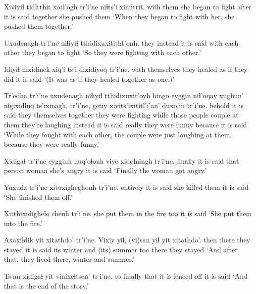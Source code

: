 \documentclass[12pt]{article}
\begin{document}
\gll Xiviyiɬ tidltthit  xotl'ogh tr'i'ne niɬts'i  xiniɬtrit.
{with them} {she began to fight} after  {it is said} together {she pushed them}
\glt `When they began to fight with her, she pushed them together.'
\glend

\gll Uxudenagh  tr'i'ne niɬiyiɬ  tthidixuxititht'onh.
{they instead} {it is said} {with each other} {they began to fight}
\glt `So they were fighting with each other.'
\glend

\gll Idiyiɬ nixidinek  xiq'i ts'i dixidiyoq tr'i'ne.
{with themselves} {they healed} {as if} {} {they did } {it is said}
\glt `(It was as if they healed together as one.)'
\glend

\gll Tr'edha tr'i'ne uxudenagh niɬiyiɬ  tthidixuxit'oyh hingo  eyggin niɬ'oqay xughun' nigixidluq ts'ixinagh, tr'i'ne, getiy xivits'ixititl'i'an' duxo'in tr'i'ne.
behold  {it is said} {they themselves} together {they were fighting} while {those people} couple {at them} {they're laughing} instead {it is said} really {they were funny} because {it is said}
\glt `While they fought with each other, the couple were just laughing at them, because they were really funny.'
\glend

\gll Xidigaɬ tr'i'ne eygginh nuq'oɬonh {viye xidolningh} tr'i'ne.
finally  {it is said} {that person} woman {she's angry} {it is said}
\glt `Finally the woman got angry.'
\glend

\gll Yuxudz tr'i'ne xituxigheghonh tr'i'ne.
entirely {it is said} {she killed them} {it is said}
\glt `She finished them off.'
\glend

\gll Xitthixidighelo  chenh tr'i'ne.
{she put them in the fire} too {it is said}
\glt `She put them into the fire.'
\glend

\gll Axaxiɬdik yit xitathdo' tr'i'ne. Vixiy  yiɬ,  (vi)san  yiɬ yit xitathdo'.
then  there {they stayed} {it is said} {its winter} and {(its) summer} too there {they stayed}
\glt `And after that, they lived there, winter and summer.'
\glend

\gll Ts'an xidigaɬ yit vinixeɬtsen'  tr'i'ne.
so finally  that {it is fenced off}  {it is said}
\glt `And that is the end of the story.'
\glend
\end{document}
